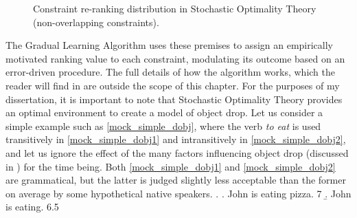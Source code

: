 \begin{figure}[htb]
\caption{Constraint re-ranking distribution in Stochastic Optimality Theory (non-overlapping constraints).}
\end{figure}

The Gradual Learning Algorithm uses these premises to assign an empirically motivated ranking value to each constraint, modulating its outcome based on an error-driven procedure. The full details of how the algorithm works, which the reader will find in \textcite{BoersmaHayes2001empirical} are outside the scope of this chapter. For the purposes of my dissertation, it is important to note that Stochastic Optimality Theory provides an optimal environment to create a model of object drop. Let us consider a simple example such as \ref{mock_simple_dobj}, where the verb \textit{to eat} is used transitively in \ref{mock_simple_dobj1} and intransitively in \ref{mock_simple_dobj2}, and let us ignore the effect of the many factors influencing object drop (discussed in ) for the time being. Both \ref{mock_simple_dobj1} and \ref{mock_simple_dobj2} are grammatical, but the latter is judged slightly less acceptable than the former on average by some hypothetical native speakers.
\ex. \label{mock_simple_dobj} \a. \label{mock_simple_dobj1} John is eating pizza. \hfill 7
\b. \label{mock_simple_dobj2} John is eating. \hfill 6.5

